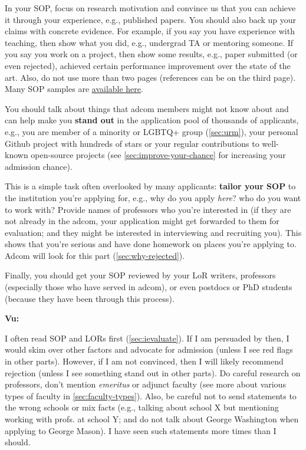 \documentclass[oneside,11pt,dvipsnames]{book}
\newenvironment{commentbox}[1][]{
  \small
  \begin{mybox}
    {\small \textbf{#1}}
  }{
  \end{mybox}
}
\begin{document}
In your SOP, focus on research motivation and convince us that you can achieve it through your experience, e.g., published papers. You should also back up your claims with concrete evidence. For example, if you say you have experience with teaching, then show what you did, e.g., undergrad TA or mentoring someone.  If you say you work on a project, then show some results, e.g., paper submitted (or even rejected), achieved certain performance improvement over the state of the art. Also, do not use more than two pages (references can be on the third page). Many SOP samples are \href{https://cs-sop.org/}{available here}.

You should talk about things that adcom members might not know about and can help make you \textbf{stand out} in the application pool of thousands of applicants, e.g., you are member of a minority or LGBTQ+ group (\autoref{sec:urm}), your personal Github project with hundreds of stars or your regular contributions to well-known open-source projects (see \autoref{sec:improve-your-chance} for increasing your admission chance).


This is a simple task often overlooked by many applicants: \textbf{tailor your SOP} to the institution you're applying for,
e.g., why do you apply \emph{here}? who do you want to work with?
Provide names of professors who you're interested in (if they are not already in the adcom, your application might get forwarded to them for evaluation; and they might be interested in interviewing and recruiting you).
This shows that you're serious and have done homework on places you're applying to.
Adcom will look for this part (\autoref{sec:why-rejected}).

Finally, you should get your SOP reviewed by your LoR writers, professors (especially those who have served in adcom), or even postdocs or PhD students (because they have been through this process).

\begin{commentbox}[Vu:]
  I often read SOP and LORs first (\autoref{sec:ievaluate}). If I am
  persuaded by then, I would skim over other factors and advocate for
  admission (unless I see red flags in other parts). However, if I am not
  convinced, then I will likely recommend rejection (unless I see
  something stand out in other parts).
  \tcblower
  Do careful research on professors, don't mention \emph{emeritus} or adjunct faculty (see more about various types of faculty in \autoref{sec:faculty-types}).
  Also, be careful not to send statements to the wrong schools or mix
  facts (e.g., talking about school X but mentioning working with
  profs. at school Y; and do not talk about George Washington when applying to George Mason). I have seen such statements more times than I should.
\end{commentbox}
\end{document}
